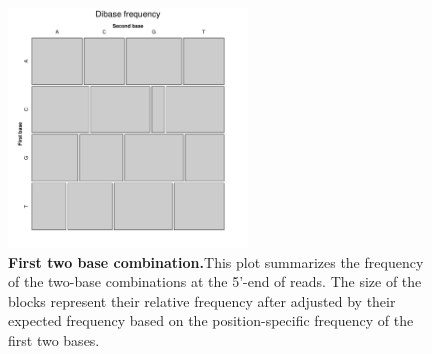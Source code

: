 \documentclass{article}
\begin{document}
\begin{center}
\begin{figure}
\includegraphics[width=2.5in, height=2.5in]{bamchop-base-two}
\caption{\textbf{First two base combination.}\small{This plot summarizes the frequency of the two-base combinations at the 5'-end of reads. The size of the blocks represent their relative frequency after adjusted by their expected frequency based on the position-specific frequency of the first two bases.}}
\end{figure}
\end{center}
\end{document}
